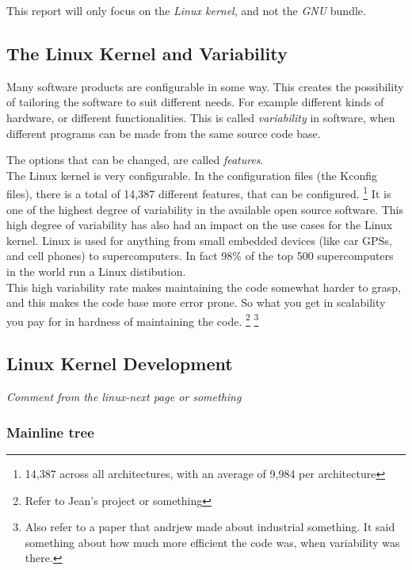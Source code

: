 \documentclass[a4paper,11pt]{article}
\begin{document}
This report will only focus on the \emph{Linux kernel}, and not the \emph{GNU} 
bundle.


        \subsection{The Linux Kernel and Variability}


Many software products are configurable in some way. This creates the 
possibility of tailoring the software to suit different needs. For example 
different kinds of hardware, or different functionalities. This is called 
\emph{variability} in software, when different programs can be made from the 
same source code base.

The options that can be changed, are called \emph{features}.
\\

The Linux kernel is very configurable. In the configuration files (the Kconfig 
files), there is a total of 14,387 different features, that can be configured.
    \footnote {14,387 across all architectures, with an average of 9,984 per 
        architecture}
It is one of the highest degree of variability in the available open source 
software.
This high degree of variability has also had an impact on the use cases for the 
Linux kernel. Linux is used for anything from small embedded devices (like car 
GPSs, and cell phones) to supercomputers.
In fact 98\% of the top 500 supercomputers in the world run a Linux distibution.
    \cite{top500}
\\

This high variability rate makes maintaining the code somewhat harder to 
grasp, and this makes the code base more error prone. So what you get in 
scalability you pay for in hardness of maintaining the code. 
    \footnote{Refer to Jean's project or something}
    \footnote{Also refer to a paper that andrjew made about industrial 
        something. It said something about how much more efficient the code was,
        when variability was there.}


        \subsection{Linux Kernel Development}

\begin{center}
    \emph{
        Comment from the linux-next page or something
    }
\end{center}


        \subsubsection{Mainline tree}
\end{document}
